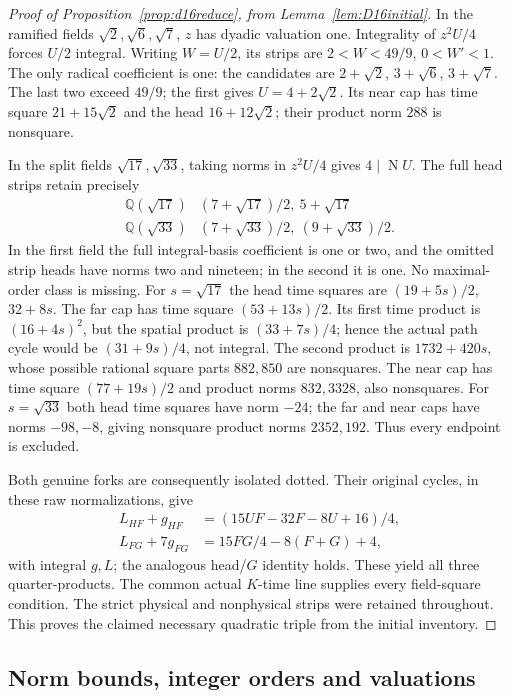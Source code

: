 \documentclass[11pt]{article}
\newcommand{\N}{\operatorname{N}}
\begin{document}
\begin{proof}[Proof of Proposition~\ref{prop:d16reduce}, from
Lemma~\ref{lem:D16initial}]
In the ramified fields $\sqrt2,\sqrt6,\sqrt7$, $z$ has dyadic
valuation one. Integrality of $z^2U/4$ forces $U/2$ integral.
Writing $W=U/2$, its strips are $2<W<49/9$, $0<W'<1$.
The only radical coefficient is one: the candidates are
$2+\sqrt2$, $3+\sqrt6$, $3+\sqrt7$.
The last two exceed $49/9$; the first gives $U=4+2\sqrt2$.
Its near cap has time square $21+15\sqrt2$ and the head
$16+12\sqrt2$; their product norm $288$ is nonsquare.

In the split fields $\sqrt{17},\sqrt{33}$, taking norms in
$z^2U/4$ gives $4\mid\N U$.
The full head strips retain precisely
\[
\begin{array}{c|l}
\mathbb Q(\sqrt{17})&(7+\sqrt{17})/2,\ 5+\sqrt{17}\\
\mathbb Q(\sqrt{33})&(7+\sqrt{33})/2,\ (9+\sqrt{33})/2.
\end{array}
\]
In the first field the full integral-basis coefficient is one or two,
and the omitted strip heads have norms two and nineteen; in the
second it is one. No maximal-order class is missing.
For $s=\sqrt{17}$ the head time squares are $(19+5s)/2$, $32+8s$.
The far cap has time square $(53+13s)/2$. Its first time product is
$(16+4s)^2$, but the spatial product is $(33+7s)/4$; hence the
actual path cycle would be $(31+9s)/4$, not integral.
The second product is $1732+420s$, whose possible rational square
parts $882,850$ are nonsquares. The near cap has time square
$(77+19s)/2$ and product norms $832,3328$, also nonsquares.
For $s=\sqrt{33}$ both head time squares have norm $-24$;
the far and near caps have norms $-98,-8$, giving nonsquare
product norms $2352,192$. Thus every endpoint is excluded.

Both genuine forks are consequently isolated dotted. Their original
cycles, in these raw normalizations, give
\[
\begin{split}
 L_{HF}+g_{HF}&=(15UF-32F-8U+16)/4,\\
 L_{FG}+7g_{FG}&=15FG/4-8(F+G)+4,
\end{split}
\]
with integral $g,L$; the analogous head/$G$ identity holds.
These yield all three quarter-products. The common actual $K$-time
line supplies every field-square condition. The strict physical and
nonphysical strips were retained throughout. This proves the claimed
necessary quadratic triple from the initial inventory.
\end{proof}

\subsection{Norm bounds, integer orders and valuations}
\end{document}
